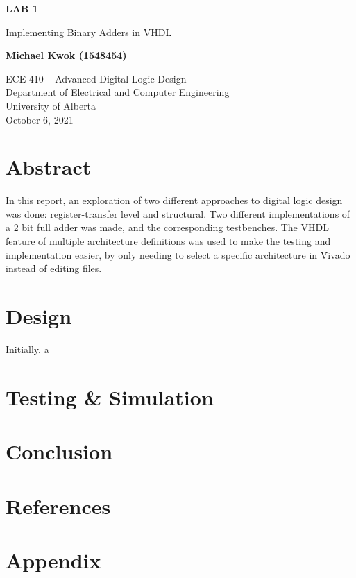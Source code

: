 \documentclass[12pt]{article}
\begin{document}
\begin{titlepage}
    \begin{center}
        \vspace*{1cm}

        \textbf{LAB 1}

        \vspace{0.5cm}

        Implementing Binary Adders in VHDL

        \vspace{1.5cm}

        \textbf{Michael Kwok (1548454)}

        \vfill

        ECE 410 -- Advanced Digital Logic Design\\
        Department of Electrical and Computer Engineering\\
        University of Alberta\\
        October 6, 2021

    \end{center}
\end{titlepage}

\tableofcontents

\pagebreak

\section{Abstract}

In this report, an exploration of two different approaches to digital logic design was done: register-transfer level and structural.
Two different implementations of a 2 bit full adder was made, and the corresponding testbenches.
The VHDL feature of multiple architecture definitions was used to make the testing and implementation easier,
by only needing to select a specific architecture in Vivado instead of editing files.

\section{Design}

Initially, a

\section{Testing \& Simulation}

\section{Conclusion}

\section{References}

\pagebreak
\section{Appendix}

\renewcommand{\thepage}{}
\end{document}
